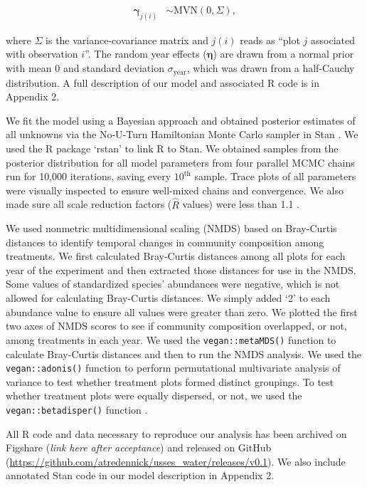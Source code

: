 \documentclass[fleqn,10pt,lineno]{wlpeerj} %
\begin{document}
\vspace{-1em}

\begin{align}
\boldsymbol{\gamma}_{j(i)} &\sim \text{MVN} \left( 0, \Sigma  \right),
\end{align}

\noindent{}where \(\Sigma\) is the variance-covariance matrix and
\(j(i)\) reads as ``plot \(j\) associated with observation \(i\)''. The
random year effects (\(\boldsymbol{\eta}\)) are drawn from a normal
prior with mean 0 and standard deviation \(\sigma_{\text{year}}\), which
was drawn from a half-Cauchy distribution. A full description of our
model and associated R \citep{R2016} code is in Appendix 2.

We fit the model using a Bayesian approach and obtained posterior
estimates of all unknowns via the No-U-Turn Hamiltonian Monte Carlo
sampler in Stan \citep{stan2016}. We used the R package `rstan'
\citep{rstan2016} to link R \citep{R2016} to Stan. We obtained samples
from the posterior distribution for all model parameters from four
parallel MCMC chains run for 10,000 iterations, saving every
\(10^{\text{th}}\) sample. Trace plots of all parameters were visually
inspected to ensure well-mixed chains and convergence. We also made sure
all scale reduction factors (\(\hat{R}\) values) were less than 1.1
\citep{Gelman2009}.

We used nonmetric multidimensional scaling (NMDS) based on Bray-Curtis
distances to identify temporal changes in community composition among
treatments. We first calculated Bray-Curtis distances among all plots
for each year of the experiment and then extracted those distances for
use in the NMDS. Some values of standardized species' abundances were
negative, which is not allowed for calculating Bray-Curtis distances. We
simply added `2' to each abundance value to ensure all values were
greater than zero. We plotted the first two axes of NMDS scores to see
if community composition overlapped, or not, among treatments in each
year. We used the \texttt{vegan::metaMDS()} function \citep{Oksanen2016}
to calculate Bray-Curtis distances and then to run the NMDS analysis. We
used the \texttt{vegan::adonis()} function \citep{Oksanen2016} to
perform permutational multivariate analysis of variance to test whether
treatment plots formed distinct groupings. To test whether treatment
plots were equally dispersed, or not, we used the
\texttt{vegan::betadisper()} function \citep{Oksanen2016}.

All R code and data necessary to reproduce our analysis has been
archived on Figshare (\emph{link here after acceptance}) and released on
GitHub (\url{https://github.com/atredennick/usses_water/releases/v0.1}).
We also include annotated Stan code in our model description in Appendix
2.
\end{document}
